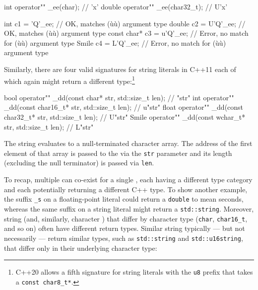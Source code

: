 \begin{emcppslisting}[emcppsbatch=e10]
int    operator"" _ee(char);      //  'x'
double operator"" _ee(char32_t);  // U'x'

int         c1 =  'Q'_ee;  // OK, matches (ù{}ù) argument type
double      c2 = U'Q'_ee;  // OK, matches (ù{}ù) argument type
const char* c3 = u'Q'_ee;  // Error, no match for (ù{}ù) argument type
Smile       c4 = L'Q'_ee;  // Error, no match for (ù{}ù) argument type
\end{emcppslisting}
    
\noindent Similarly, there are four valid  signatures for
string literals in C++11 each of which again might
return a different type:{\cprotect\footnote{C++20 allows a fifth signature for
string literals with the \lstinline!u8! prefix that takes a \lstinline!const char8_t*!.}}

\begin{emcppslisting}[emcppsbatch=e10]
bool  operator"" _dd(const char*     str, std::size_t len);  //   "str"
int   operator"" _dd(const char16_t* str, std::size_t len);  //  u"str"
float operator"" _dd(const char32_t* str, std::size_t len);  //  U"str"
Smile operator"" _dd(const wchar_t*  str, std::size_t len);  //  L"str"
\end{emcppslisting}
    
\noindent The string  evaluates to a null-terminated
character array. The address of the first element of that array is
passed to the  via the \lstinline!str! parameter and
its length (excluding the null terminator) is passed via \lstinline!len!.

To recap, multiple  can co-exist
for a single , each having a different type category
and each potentially returning a different C++ type. To show another
example, the suffix \lstinline!_s! on a floating-point literal could
return a \lstinline!double! to mean seconds, whereas the same suffix on a
string literal might return a \lstinline!std::string!. Moreover, string
 (and, similarly, character ) that differ by character type (\lstinline!char!,
\lstinline!char16_t!, and so on) often have different return types.
Similar string  typically --- but not necessarily
--- return similar types, such as \lstinline!std::string! and
\lstinline!std::u16string!, that differ only in their underlying character
type:

